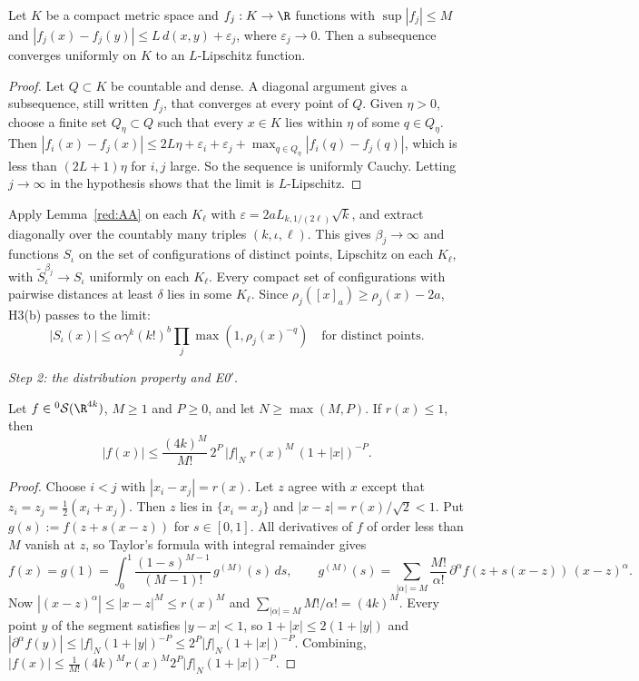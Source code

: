 \begin{lemma}\label{red:AA}
Let $K$ be a compact metric space and $f_j:K\to\R$ functions with $\sup|f_j|\le M$ and $|f_j(x)-f_j(y)|\le L\,d(x,y)+\varepsilon_j$, where $\varepsilon_j\to0$. Then a subsequence converges uniformly on $K$ to an $L$-Lipschitz function.
\end{lemma}

\begin{proof}
Let $Q\subset K$ be countable and dense. A diagonal argument gives a subsequence, still written $f_j$, that converges at every point of $Q$. Given $\eta>0$, choose a finite set $Q_\eta\subset Q$ such that every $x\in K$ lies within $\eta$ of some $q\in Q_\eta$. Then $|f_i(x)-f_j(x)|\le2L\eta+\varepsilon_i+\varepsilon_j+\max_{q\in Q_\eta}|f_i(q)-f_j(q)|$, which is less than $(2L+1)\eta$ for $i,j$ large. So the sequence is uniformly Cauchy. Letting $j\to\infty$ in the hypothesis shows that the limit is $L$-Lipschitz.
\end{proof}

Apply Lemma~\ref{red:AA} on each $K_\ell$ with $\varepsilon=2aL_{k,1/(2\ell)}\sqrt k$, and extract diagonally over the countably many triples $(k,\iota,\ell)$. This gives $\beta_j\to\infty$ and functions $S_\iota$ on the set of configurations of distinct points, Lipschitz on each $K_\ell$, with $\tilde S^{\beta_j}_\iota\to S_\iota$ uniformly on each $K_\ell$. Every compact set of configurations with pairwise distances at least $\delta$ lies in some $K_\ell$. Since $\rho_j([x]_a)\ge\rho_j(x)-2a$, H3(b) passes to the limit:
\begin{equation}\label{red:growth-limit}
  |S_\iota(x)|\le\alpha\gamma^k(k!)^b\prod_{j}\max(1,\rho_j(x)^{-q})\quad\text{for distinct points.}
\end{equation}

\emph{Step 2: the distribution property and E0$'$.}

\begin{lemma}[Taylor]\label{red:taylor}
Let $f\in{}^0\mathcal S(\R^{4k})$, $M\ge1$ and $P\ge0$, and let $N\ge\max(M,P)$. If $r(x)\le1$, then
\[
  |f(x)|\le\frac{(4k)^M}{M!}\,2^P\,|f|_N\;r(x)^M\,(1+|x|)^{-P}.
\]
\end{lemma}

\begin{proof}
Choose $i<j$ with $|x_i-x_j|=r(x)$. Let $z$ agree with $x$ except that $z_i=z_j=\tfrac12(x_i+x_j)$. Then $z$ lies in $\{x_i=x_j\}$ and $|x-z|=r(x)/\sqrt2<1$. Put $g(s):=f(z+s(x-z))$ for $s\in[0,1]$. All derivatives of $f$ of order less than $M$ vanish at $z$, so Taylor's formula with integral remainder gives
\[
  f(x)=g(1)=\int_0^1\frac{(1-s)^{M-1}}{(M-1)!}\,g^{(M)}(s)\,ds,
  \qquad
  g^{(M)}(s)=\sum_{|\alpha|=M}\frac{M!}{\alpha!}\,\partial^\alpha f(z+s(x-z))\,(x-z)^\alpha .
\]
Now $|(x-z)^\alpha|\le|x-z|^M\le r(x)^M$ and $\sum_{|\alpha|=M}M!/\alpha!=(4k)^M$. Every point $y$ of the segment satisfies $|y-x|<1$, so $1+|x|\le2(1+|y|)$ and $|\partial^\alpha f(y)|\le|f|_N(1+|y|)^{-P}\le2^P|f|_N(1+|x|)^{-P}$. Combining, $|f(x)|\le\frac{1}{M!}(4k)^M r(x)^M2^P|f|_N(1+|x|)^{-P}$.
\end{proof}

